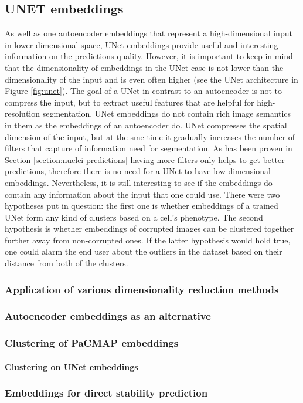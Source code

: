 \subsection{UNET embeddings}
    \label{section:unet-embeddings-study}
    As well as one autoencoder embeddings that represent a high-dimensional input in lower dimensional space, UNet embeddings provide useful and interesting information on the predictions quality. However, it is important to keep in mind that the dimensionality of embeddings in the UNet case is not lower than the dimensionality of the input and is even often higher (see the UNet architecture in Figure \ref{fig:unet}). The goal of a UNet in contrast to an autoencoder is not to compress the input, but to extract useful features that are helpful for high-resolution segmentation. UNet embeddings do not contain rich image semantics in them as the embeddings of an autoencoder do. UNet compresses the spatial dimension of the input, but at the sme time it gradually increases the number of filters that capture of information need for segmentation. As has been proven in Section \ref{section:nuclei-predictions} having more filters only helps to get better predictions, therefore there is no need for a UNet to have low-dimensional embeddings. Nevertheless, it is still interesting to see if the embeddings do contain any information about the input that one could use. There were two hypotheses put in question: the first one is whether embeddings of a trained UNet form any kind of clusters based on a cell's phenotype. The second hypothesis is whether embeddings of corrupted images can be clustered together further away from non-corrupted ones. If the latter hypothesis would hold true, one could alarm the end user about the outliers in the dataset based on their distance from both of the clusters. 
    \subsubsection{Application of various dimensionality reduction methods}
        \label{section:unet-embeddings-dim-reduction}
        
    \subsubsection{Autoencoder embeddings as an alternative}
        
    \subsubsection{Clustering of PaCMAP embeddings}
        \label{section:pacmap-embeddings-clustering}
        \paragraph{Clustering on UNet embeddings}
        \label{section:clustering-on-unet-embeddings}
        
    \subsubsection{Embeddings for direct stability prediction}
        